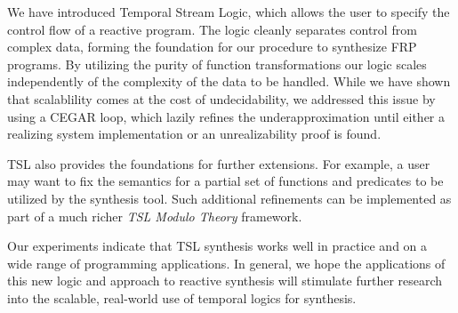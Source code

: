 We have introduced Temporal Stream Logic, which allows the user to
specify the control flow of a reactive program.  The logic cleanly
separates control from complex data, forming the foundation for our
procedure to synthesize FRP programs. By utilizing the purity of
function transformations our logic scales independently of the
complexity of the data to be handled. While we have shown that
scalablility comes at the cost of undecidability, we addressed this
issue by using a CEGAR loop, which lazily refines the
underapproximation until either a realizing system implementation or
an unrealizability proof is found.

TSL also provides the foundations for further extensions. For example,
a user may want to fix the semantics for a partial set of functions and
predicates to be utilized by the synthesis tool. Such additional
refinements can be implemented as part of a much richer \textit{TSL
  Modulo Theory} framework.

Our experiments indicate that TSL synthesis works well in practice and on
a wide range of programming applications.  In general, we hope the
applications of this new logic and approach to reactive synthesis will
stimulate further research into the scalable, real-world use of
temporal logics for synthesis.
